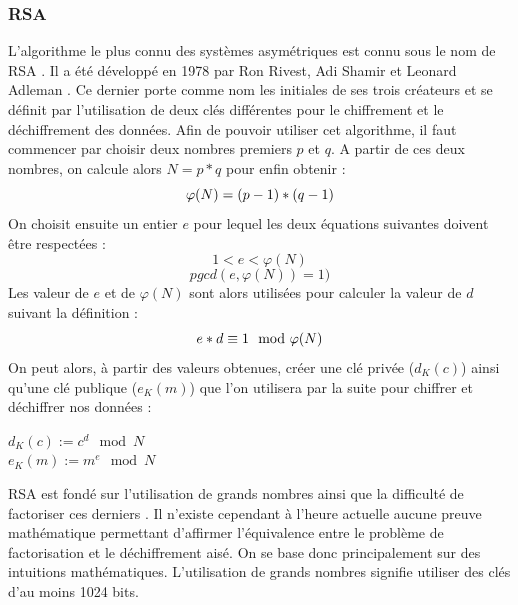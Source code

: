 \documentclass[letterpaper]{article}
\begin{document}
\subsubsection{RSA}
 L'algorithme le plus connu des systèmes asymétriques est connu sous le nom de RSA \cite{ref6}. Il a été développé en 1978 par Ron Rivest, Adi Shamir et Leonard Adleman \cite{ref7}. Ce dernier porte comme nom les initiales de ses trois créateurs et se définit par l'utilisation de deux clés différentes pour le chiffrement et le déchiffrement des données. Afin de pouvoir utiliser cet algorithme, il faut commencer par choisir deux nombres premiers $p$ et $q$. A partir de ces deux nombres, on calcule alors $N = p*q$ pour enfin obtenir : \vspace{-0.2cm}
\begin{equation}
\varphi(N) = (p-1)*(q-1)\vspace{-0.1cm}
\end{equation}
On choisit ensuite un entier $e$ pour lequel les deux équations suivantes doivent être respectées : \vspace{-0.2cm}
\begin{equation}
1 < e < \varphi(N)
\end{equation}\vspace{-0.5cm}
\begin{equation}
pgcd(e,\varphi(N)) = 1)
\end{equation}
Les valeur de $e$ et de $\varphi(N)$ sont alors utilisées pour calculer la valeur de $d$ suivant la définition :\vspace{-0.2cm}
\begin{equation}
e*d \equiv 1 \mod \varphi(N) \vspace{-0.1cm}
\end{equation}
On peut alors, à partir des valeurs obtenues, créer une clé privée ($d_K(c)$) ainsi qu'une clé publique ($e_K(m)$) que l'on utilisera par la suite pour chiffrer et déchiffrer nos données : 
\begin{center}
$d_K(c) := c^d \mod N$  \vspace{0.2cm} \\
$e_K(m) := m^e \mod N$
\end{center}
RSA est fondé sur l'utilisation de grands nombres ainsi que la difficulté de factoriser ces derniers \cite{ref6}. Il n'existe cependant à l'heure actuelle aucune preuve mathématique permettant d'affirmer l'équivalence entre le problème de factorisation et le déchiffrement aisé. On se base donc principalement sur des intuitions mathématiques. L'utilisation de grands nombres signifie utiliser des clés d'au moins 1024 bits. \\
\end{document}
